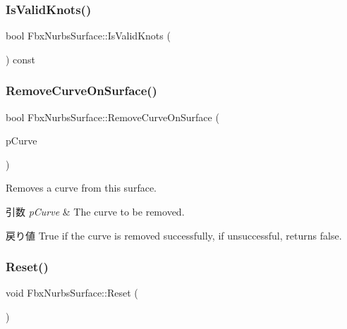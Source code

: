 \subsubsection{\texorpdfstring{Is\+Valid\+Knots()}{IsValidKnots()}}
{\footnotesize\ttfamily bool Fbx\+Nurbs\+Surface\+::\+Is\+Valid\+Knots (\begin{DoxyParamCaption}{ }\end{DoxyParamCaption}) const}

\mbox{\label{class_fbx_nurbs_surface_abe5eaddfe1980604707ccd027159d6dd}} 
\subsubsection{\texorpdfstring{Remove\+Curve\+On\+Surface()}{RemoveCurveOnSurface()}}
{\footnotesize\ttfamily bool Fbx\+Nurbs\+Surface\+::\+Remove\+Curve\+On\+Surface (\begin{DoxyParamCaption}\item[{\hyperlink{class_fbx_node}{Fbx\+Node} $\ast$}]{p\+Curve }\end{DoxyParamCaption})}

Removes a curve from this surface. 
\begin{DoxyParams}{引数}
{\em p\+Curve} & The curve to be removed. \\
\hline
\end{DoxyParams}
\begin{DoxyReturn}{戻り値}
{\ttfamily True} if the curve is removed successfully, if unsuccessful, returns {\ttfamily false}. 
\end{DoxyReturn}
\mbox{\label{class_fbx_nurbs_surface_adb9af63ca3aff4ace0f36686dc49ec27}} 
\subsubsection{\texorpdfstring{Reset()}{Reset()}}
{\footnotesize\ttfamily void Fbx\+Nurbs\+Surface\+::\+Reset (\begin{DoxyParamCaption}{ }\end{DoxyParamCaption})}



